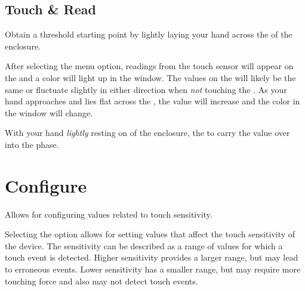 \subsection{Touch \& Read} 

Obtain a threshold starting point by lightly laying your hand across the 
of the enclosure.

\par\medskip

After selecting the  menu option, readings from the touch sensor will
appear on the  and a color will light up in the  window.  The
values on the  will likely be the same or fluctuate slightly in either
direction when \textit{not} touching the .  As your hand approaches and
lies flat across the , the value will increase and the color in the
 window will change.

\par\medskip

With your hand \textit{lightly} resting on  of the enclosure,  the
 to carry the value over into the \hyperref[Test and Adjust]{}
phase.


\section{Configure} \label{Touch Configuration} 

Allows for configuring values related to touch sensitivity.

\par\medskip

Selecting the  option allows for setting values that affect the touch
sensitivity of the device.  The sensitivity can be described as a range of
values for which a touch event is detected.  Higher sensitivity provides a
larger range, but may lead to erroneous events.  Lower sensitivity has a smaller
range, but may require more touching force and also may not detect touch events.

